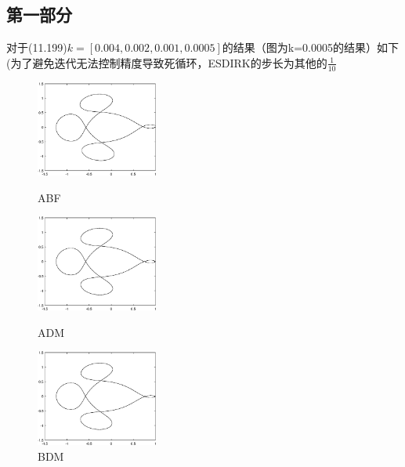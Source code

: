 \documentclass[12]{article}%
\begin{document}
\subsection{第一部分}
对于(11.199)$k=[0.004,0.002,0.001,0.0005]$的结果（图为k=0.0005的结果）如下(为了避免迭代无法控制精度导致死循环，ESDIRK的步长为其他的$\frac{1}{10}$
\begin{figure}[H]
    \centering
    \begin{minipage}[t]{0.3\textwidth}
    \centering
    \includegraphics[width=4cm]{../pic/ABF1.eps}
    \caption{ABF}
    \end{minipage}
    \begin{minipage}[t]{0.3\textwidth}
    \centering
    \includegraphics[width=4cm]{../pic/ADM1.eps}
    \caption{ADM}
    \end{minipage}
    \begin{minipage}[t]{0.3\textwidth}
    \centering
    \includegraphics[width=4cm]{../pic/BDF1.eps}
    \caption{BDM}
    \end{minipage}
\end{figure}
\end{document}

